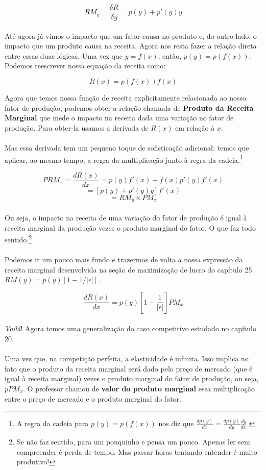 \documentclass[a4paper,11pt,oneside]{book}
\theoremstyle{definition}
\theoremstyle{break}
\begin{document}
$$ RM_y = \frac{\delta R}{\delta y} = p(y) + p'(y)y $$
\\
Até agora já vimos o impacto que um fator causa no produto e, do outro lado, o impacto que um produto causa na receita. Agora nos resta fazer a relação direta entre essas duas lógicas. Uma vez que $y = f(x)$, então, $p(y) = p(f(x))$. Podemos reescrever nossa equação da receita como:

$$ R(x) = p(f(x))f(x) $$

Agora que temos nossa função de receita explicitamente relacionada ao nosso fator de produção, podemos obter a relação chamada de \textbf{Produto da Receita Marginal} que mede o impacto na receita dada uma variação no fator de produção. Para obter-la usamos a derivada de $R(x)$ em relação à $x$. 
\\
\\
Mas essa derivada tem um pequeno toque de sofisticação adicional: temos que aplicar, ao mesmo tempo, a regra da multiplicação junto à regra da cadeia.\footnote{A regra da cadeia para $p(y) = p(f(x))$ nos diz que $\frac{d p(y) }{d x} = \frac{d p(y)}{d y} \frac{d y}{d x} $.}

$$ PRM_x = \frac{d R(x)}{d x} = p(y)f'(x) + f(x)p'(y)f'(x) $$
$$ = [p(y) + p'(y)y]f'(x) $$
$$ = RM_y \times PM_x $$
\\
Ou seja, o impacto na receita de uma variação do fator de produção é igual à receita marginal da produção vezes o produto marginal do fator. O que faz todo sentido.\footnote{Se não faz sentido, para um pouquinho e pensa um pouco. Apenas ler sem compreender é perda de tempo. Mas passar horas tentando entender é muito produtivo!}
\\
\\
Podemos ir um pouco mais fundo e trazermos de volta a nossa expressão da receita marginal desenvolvida na seção de maximização de lucro do capítulo 25. $RM(y) = p(y) \left[ 1 - 1/|\epsilon| \right]$.

$$ \frac{d R(x)}{d x} = p(y) \left[ 1 - \frac{1}{|\epsilon|} \right] PM_x $$
\\
\textit{Voilá}! Agora temos uma generalização do caso competitivo estudado no capítulo 20. 
\\
\\
Uma vez que, na competição perfeita, a elasticidade é infinita. Isso implica no fato que o produto da receita marginal será dado pelo preço de mercado (que é igual à receita marginal) vezes o produto marginal do fator de produção, ou seja, $p PM_x$. O professor chamou de \textbf{valor do produto marginal} essa multiplicação entre o preço de mercado e o produto marginal do fator.
\end{document}
